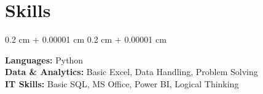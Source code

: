 \documentclass[10pt, letterpaper]{article}
\newenvironment{onecolentry}{
    \begin{adjustwidth}{
        0.2 cm + 0.00001 cm
    }{
        0.2 cm + 0.00001 cm
    }
}{
    \end{adjustwidth}
} %
\begin{document}
    \section{Skills}
    \begin{onecolentry}
        \textbf{Languages:} Python \\
        \textbf{Data \& Analytics:} Basic Excel, Data Handling, Problem Solving \\
        \textbf{IT Skills:} Basic SQL, MS Office, Power BI, Logical Thinking
    \end{onecolentry}
\end{document}
